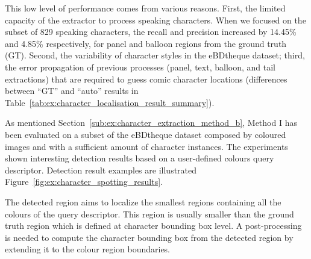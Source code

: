 This low level of performance comes from various reasons.
First, the limited capacity of the extractor to process speaking characters.
When we focused on the subset of 829 speaking characters, the recall and precision increased by 14.45\% and 4.85\% respectively, for panel and balloon regions from the ground truth (GT).
Second, the variability of character styles in the eBDtheque dataset; third, the error propagation of previous processes (panel, text, balloon, and tail extractions) that are required to guess comic character locations (differences between ``GT'' and ``auto'' results in Table~\ref{tab:ex:character_localisation_result_summary}).





As mentioned Section~\ref{sub:ex:character_extraction_method_b}, Method I has been evaluated on a subset of the eBDtheque dataset composed by coloured images and with a sufficient amount of character instances.
The experiments shown interesting detection results based on a user-defined colours query descriptor.
Detection result examples are illustrated Figure~\ref{fig:ex:character_spotting_results}.

The detected region aims to localize the smallest regions containing all the colours of the query descriptor.
This region is usually smaller than the ground truth region which is defined at character bounding box level.
A post-processing is needed to compute the character bounding box from the detected region by extending it to the colour region boundaries.

